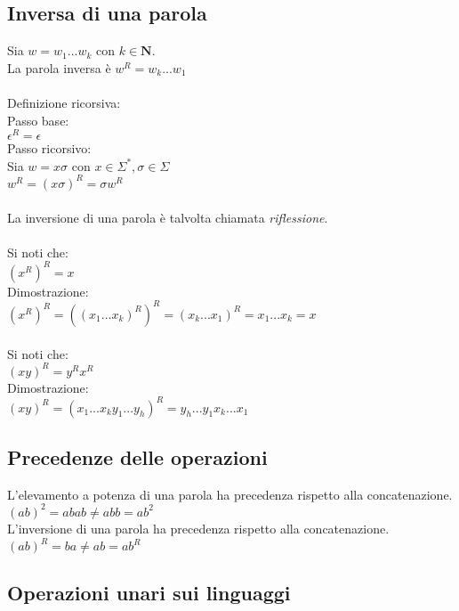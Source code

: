 \documentclass[]{article}
\begin{document}
\subsection{Inversa di una parola}

Sia \mbox{$w = w_1...w_k$} con \mbox{$k \in \mathbf{N}$}.
\\
La parola inversa è \mbox{$w^R = w_k...w_1$}
\\
\\
Definizione ricorsiva:
\\
Passo base:
\\
\mbox{$\epsilon^R = \epsilon$}
\\
Passo ricorsivo:
\\
Sia \mbox{$w = x \sigma$} con \mbox{$x \in \Sigma^*, \sigma \in \Sigma$}
\\
\mbox{$w^R = (x \sigma)^R = \sigma w^R$}
\\
\\
La inversione di una parola è talvolta chiamata \textit{riflessione}.
\\
\\
Si noti che:
\\
\mbox{$ (x^R)^R = x $}
\\
Dimostrazione:
\\
\mbox{$ (x^R)^R = ((x_1...x_k)^R)^R = (x_k...x_1)^R = x_1...x_k = x $}
\\
\\
Si noti che:
\\
\mbox{$ (xy)^R = y^R x^R $}
\\
Dimostrazione:
\\
\mbox{$ (xy)^R = (x_1...x_k y_1...y_h)^R = y_h...y_1 x_k...x_1 $}



\subsection{Precedenze delle operazioni}

L'elevamento a potenza di una parola ha precedenza rispetto alla concatenazione.
\\
\mbox{$ (ab)^2 = abab \neq abb = ab^2 $}
\\
L'inversione di una parola ha precedenza rispetto alla concatenazione.
\\
\mbox{$ (ab)^R = ba \neq ab = ab^R $}


\subsection{Operazioni unari sui linguaggi}
\end{document}
